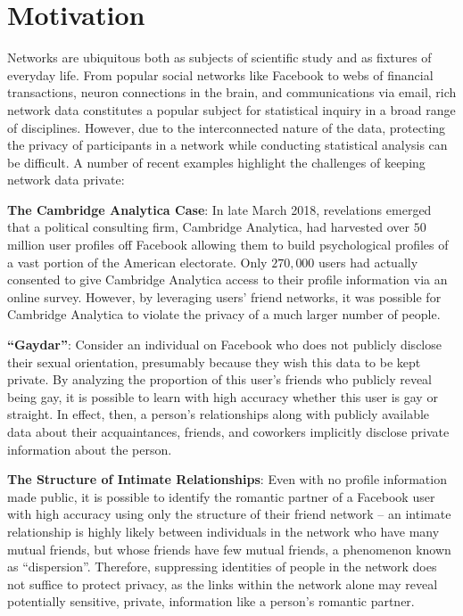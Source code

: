 \section{Motivation}

Networks are ubiquitous both as subjects of scientific study and as fixtures of everyday life. From popular social networks like Facebook to webs of financial transactions, neuron connections in the brain, and communications via email, rich network data constitutes a popular subject for statistical inquiry in a broad range of disciplines. However, due to the interconnected nature of the data, protecting the privacy of participants in a network while conducting statistical analysis can be difficult. A number of recent examples highlight the challenges of keeping network data private:

\textbf{The Cambridge Analytica Case}:
In late March 2018, revelations emerged that a political consulting firm, Cambridge Analytica, had harvested over $50$ million user profiles off Facebook allowing them to build psychological profiles of a vast portion of the American electorate. Only $270,000$ users had actually consented to give Cambridge Analytica access to their profile information via an online survey. However, by leveraging users' friend networks, it was possible for Cambridge Analytica to violate the privacy of a much larger number of people. 
\cite{nytimes}

\textbf{``Gaydar''}:
Consider an individual on Facebook who does not publicly disclose their sexual orientation, presumably because they wish this data to be kept private. By analyzing the proportion of this user's friends who publicly reveal being gay, it is possible to learn with high accuracy whether this user is gay or straight. In effect, then, a person's relationships along with publicly available data about their acquaintances, friends, and coworkers implicitly disclose private information about the person. \cite{JM09}

\textbf{The Structure of Intimate Relationships}:
Even with no profile information made public, it is possible to identify the romantic partner of a Facebook user with high accuracy using only the structure of their friend network -- an intimate relationship is highly likely between individuals in the network who have many mutual friends, but whose friends have few mutual friends, a phenomenon known as ``dispersion''. Therefore, suppressing identities of people in the network does not suffice to protect privacy, as the links within the network alone may reveal potentially sensitive, private, information like a person's romantic partner.  \cite{BK14}

